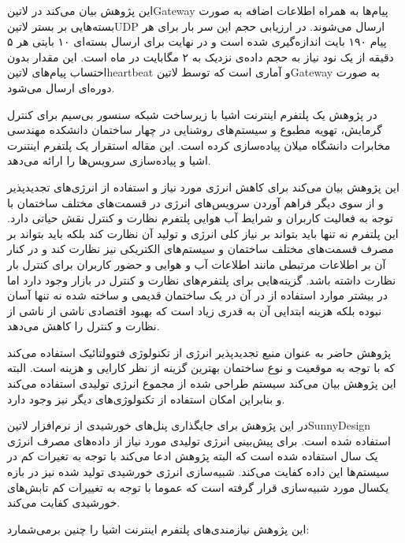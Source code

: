این پژوهش بیان می‌کند در ‌لاتین{Gateway} پیام‌ها به همراه اطلاعات اضافه به صورت بسته‌هایی بر بستر ‌لاتین{UDP} ارسال می‌شوند.
در ارزیابی حجم این سر بار برای هر پیام ۱۹۰ بایت اندازه‌گیری شده است و در نهایت برای ارسال بسته‌ای ۱۰ بایتی هر ۵ دقیقه از یک نود نیاز به
حجم داده‌ی نزدیک به ۲ مگابایت در ماه است. این مقدار بدون احتساب پیام‌های ‌لاتین{heartbeat} و آماری است که توسط ‌لاتین{Gateway}
به صورت دوره‌ای ارسال می‌شود.


در پژوهش  یک پلتفرم اینترنت اشیا با زیرساخت شبکه سنسور بی‌سیم برای کنترل گرمایش، تهویه مطبوع و سیستم‌های روشنایی در چهار ساختمان دانشکده
مهندسی مخابرات دانشگاه میلان پیاده‌سازی کرده است. این مقاله استقرار یک پلتفرم اینتنرت اشیا و پیاده‌سازی سرویس‌ها را ارائه می‌دهد.

این پژوهش بیان می‌کند برای کاهش انرژی مورد نیاز و استفاده از انرژی‌های تجدیدپذیر و از سوی دیگر فراهم آوردن سرویس‌های انرژی در قسمت‌های مختلف ساختمان با توجه به فعالیت
کاربران و شرایط آب هوایی پلتفرم نظارت و کنترل نقش حیاتی دارد. این پلتفرم نه تنها باید بتواند بر نیاز کلی انرژی و تولید آن نظارت کند بلکه باید بتواند بر مصرف قسمت‌های مختلف ساختمان
و سیستم‌های الکتریکی نیز نظارت کند و در کنار آن بر اطلاعات مرتبطی مانند اطلاعات آب و هوایی و حضور کاربران برای کنترل بار نظارت داشته باشد.
گزینه‌هایی برای پلتفرم‌های نظارت و کنترل در بازار وجود دارد اما در بیشتر موارد استفاده از در آن در یک ساختمان قدیمی و ساخته شده نه تنها آسان نبوده بلکه هزینه ابتدایی آن به قدری زیاد است
که بهبود اقتصادی ناشی از ناشی از نظارت و کنترل را کاهش می‌دهد.

پژوهش حاضر به عنوان منبع تجدید‌پذیر انرژی از تکنولوژی فتوولتائیک استفاده می‌کند که با توجه به موقعیت و نوع ساختمان بهترین گزینه از نظر کارایی و هزینه است.
البته این پژوهش بیان می‌کند سیستم طراحی شده از مجموع انرژی تولیدی استفاده می‌کند و بنابراین امکان استفاده از تکنولوژی‌های دیگر نیز وجود دارد.

در این پژوهش برای جایگذاری پنل‌های خورشیدی از نرم‌افزار ‌لاتین{SunnyDesign} استفاده شده است. برای پیش‌بینی انرژی تولیدی مورد نیاز از داده‌های مصرف
انرژی یک سال استفاده شده است که البته پژوهش ادعا می‌کند با توجه به تغیرات کم در سیستم‌ها این داده کفایت می‌کند. شبیه‌سازی انرژی خورشیدی تولید شده نیز
در بازه یکسال مورد شبیه‌سازی قرار گرفته است که عموما با توجه به تغییرات کم تابش‌های خورشیدی کفایت می‌کند.

این پژوهش نیازمندی‌های پلتفرم اینترنت اشیا را چنین برمی‌شمارد:

